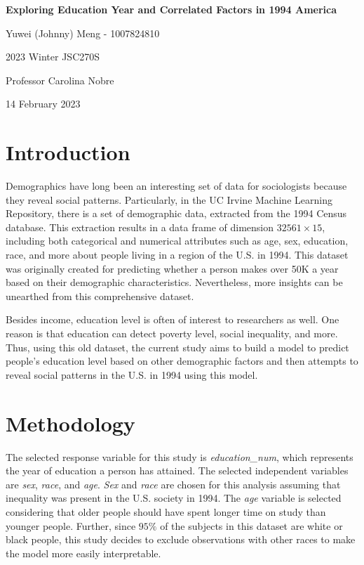\documentclass[12pt]{report}
\begin{document}
\begin{titlepage}
    \centering
    \vspace*{5cm}
    {\Large \textbf{Exploring Education Year and Correlated Factors in 1994 America}}

    \vspace{3cm}

    {\large Yuwei (Johnny) Meng - 1007824810}

    {\large 2023 Winter JSC270S}

    {\large Professor Carolina Nobre}

    {\large 14 February 2023}
\end{titlepage}

\section*{\large Introduction}

Demographics have long been an interesting set of data for sociologists because they reveal social patterns. Particularly, in the UC Irvine Machine Learning Repository, there is a set of demographic data, extracted from the 1994 Census database. This extraction results in a data frame of dimension $32561\times 15$, including both categorical and numerical attributes such as age, sex, education, race, and more about people living in a region of the U.S. in 1994. This dataset was originally created for predicting whether a person makes over 50K a year based on their demographic characteristics. Nevertheless, more insights can be unearthed from this comprehensive dataset.

Besides income, education level is often of interest to researchers as well. One reason is that education can detect poverty level, social inequality, and more. Thus, using this old dataset, the current study aims to build a model to predict people's education level based on other demographic factors and then attempts to reveal social patterns in the U.S. in 1994 using this model.

\section*{\large Methodology}

The selected response variable for this study is \textit{education\_num}, which represents the year of education a person has attained. The selected independent variables are \textit{sex}, \textit{race}, and \textit{age}. \textit{Sex} and \textit{race} are chosen for this analysis assuming that inequality was present in the U.S. society in 1994. The \textit{age} variable is selected considering that older people should have spent longer time on study than younger people. Further, since $95\%$ of the subjects in this dataset are white or black people, this study decides to exclude observations with other races to make the model more easily interpretable.
\end{document}
